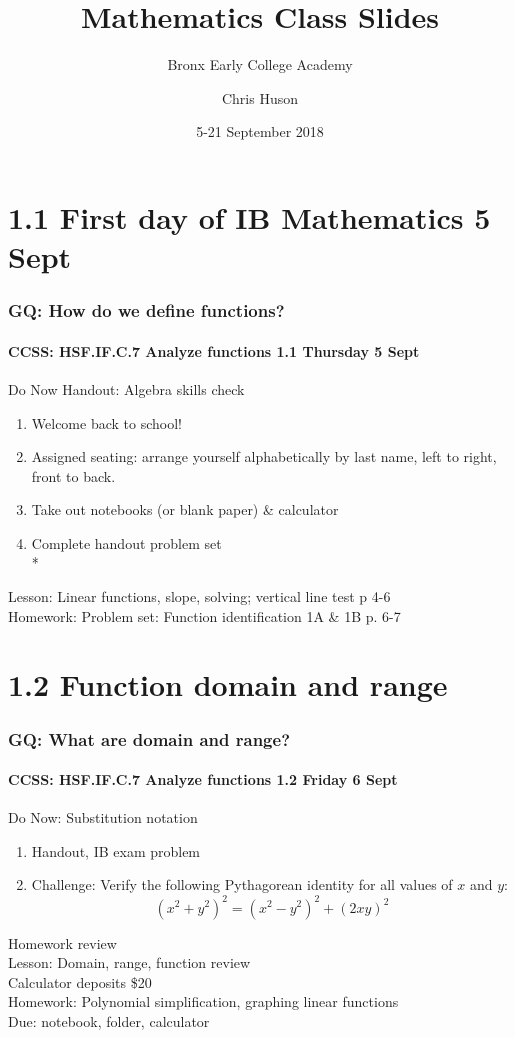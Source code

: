 \documentclass{beamer}
\title{Mathematics Class Slides}
\subtitle{Bronx Early College Academy}
\author{Chris Huson}
\date{5-21 September 2018}
\begin{document}
\frame{\titlepage}

  \section{1.1 First day of IB Mathematics 5 Sept}
  \frame
  {
    \frametitle{GQ: How do we define functions?}
    \framesubtitle{CCSS: HSF.IF.C.7 Analyze functions \hfill \alert{1.1 Thursday 5 Sept}}

    \begin{block}{Do Now Handout: Algebra skills check}
    \begin{enumerate}
        \item Welcome back to school!
        \item Assigned seating: arrange yourself alphabetically by last name, left to right, front to back.
        \item Take out notebooks (or blank paper) \& calculator
        \item Complete handout problem set\\*
    \end{enumerate}
    \end{block}
    Lesson: Linear functions, slope, solving; vertical line test p 4-6 \\%
    Homework: Problem set: Function identification 1A \& 1B p. 6-7
  }

  \section{1.2 Function domain and range}
  \frame
  {
    \frametitle{GQ: What are domain and range?}
    \framesubtitle{CCSS: HSF.IF.C.7 Analyze functions \hfill \alert{1.2 Friday 6 Sept}}

    \begin{block}{Do Now: Substitution notation}
    \begin{enumerate}
      \item Handout, IB exam problem
      \item Challenge: %
        Verify the following Pythagorean identity for all values of $x$ and $y$:
        \[(x^2+y^2)^2=(x^2-y^2)^2+(2xy)^2\]
    \end{enumerate}
    \end{block}
    Homework review\\
    Lesson: Domain, range, function review\\[5pt]
    Calculator deposits \$20
    \\[5pt]
    Homework: Polynomial simplification, graphing linear functions\\
    Due: notebook, folder, calculator
  }
\end{document}
